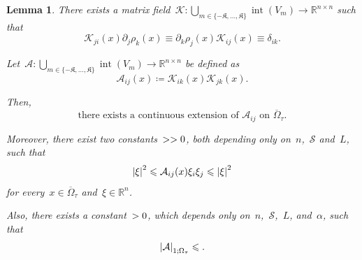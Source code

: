 \documentclass[12pt,a4paper]{amsart}
\makeatletter
\numberwithin{equation}{section}
\newtheorem{lemma}[theorem]{Lemma}
\theoremstyle{definition}
\theoremstyle{remark}
\newcommand{\R}{\mathbb{R}}
\newcommand{\abs}[1]{\left\lvert#1\right\rvert}
\renewcommand{\leq}{\leqslant}
\newcommand{\const}[1]{%
  \csname const@#1\endcsname%
}
\makeatother
\begin{document}
\begin{lemma}\label{LEM::ReflectionPullback}
    There exists a matrix field~$\mathcal{K} \colon \displaystyle{\bigcup_{m \in \{-\mathfrak{K}, \dots, \mathfrak{K}\}}} \operatorname{int}(V_m) \to \R^{n\times n}$ such that
    \begin{equation}\label{EQ::KTensorDefinition}
        \mathcal{K}_{ji}(x) \partial_j \rho_k(x) \equiv \partial_k \rho_j(x) \mathcal{K}_{ij}(x) \equiv \delta_{ik}.
    \end{equation}

    Let~$\mathcal{A} \colon \displaystyle{\bigcup_{m \in \{-\mathfrak{K}, \dots, \mathfrak{K}\}}} \operatorname{int}(V_m) \to \R^{n\times n}$ be defined as
    \begin{equation}\label{EQ::ATensorDefinition}
        \mathcal{A}_{ij}(x) \coloneq \mathcal{K}_{ik}(x) \mathcal{K}_{jk}(x).
    \end{equation}

    Then,
    \begin{equation}\label{EQ::AijContinuous}
        \text{there exists a continuous extension of }\mathcal{A}_{ij} \text{ on }\overline{\Omega}_\tau.
    \end{equation}
    
    Moreover, there exist two constants~$\const{CONST::AijEllipticUpper} > \const{CONST::AijEllipticLower} > 0$, both depending only on~$n$,~$\mathcal{S}$ and~$L$, such that
    \begin{equation}\label{EQ::AijElliptic}
        \const{CONST::AijEllipticLower}\abs{\xi}^2 \leq \mathcal{A}_{ij}(x)\xi_i\xi_j \leq \const{CONST::AijEllipticUpper}\abs{\xi}^2
    \end{equation}
    for every~$x \in \overline{\Omega}_\tau$ and~$\xi \in \R^n$.
    
    Also, there exists a constant~$\const{CONST::AijHolder} > 0$, which depends only on~$n$,~$\mathcal{S}$,~$L$, and~$\alpha$, such that
    \begin{equation}\label{EQ::AijHolder}
        \abs{\mathcal{A}}_{1; \Omega_\tau} \leq \const{CONST::AijHolder}.
    \end{equation}
\end{lemma}
\end{document}

